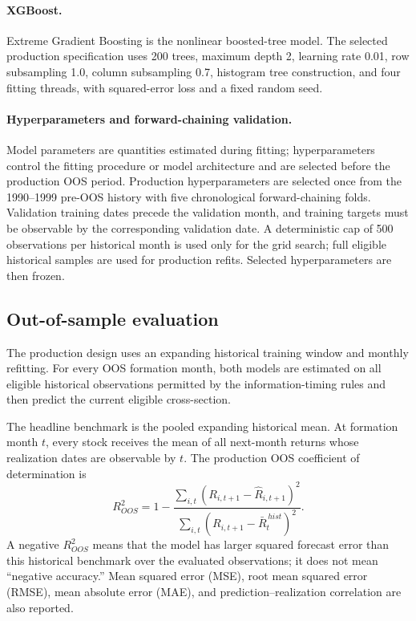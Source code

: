 \paragraph{XGBoost.}
Extreme Gradient Boosting is the nonlinear boosted-tree model. The selected production specification uses 200 trees, maximum depth 2, learning rate 0.01, row subsampling 1.0, column subsampling 0.7, histogram tree construction, and four fitting threads, with squared-error loss and a fixed random seed.

\paragraph{Hyperparameters and forward-chaining validation.}
Model parameters are quantities estimated during fitting; hyperparameters control the fitting procedure or model architecture and are selected before the production OOS period. Production hyperparameters are selected once from the 1990--1999 pre-OOS history with five chronological forward-chaining folds. Validation training dates precede the validation month, and training targets must be observable by the corresponding validation date. A deterministic cap of 500 observations per historical month is used only for the grid search; full eligible historical samples are used for production refits. Selected hyperparameters are then frozen.

\subsection{Out-of-sample evaluation}

The production design uses an expanding historical training window and monthly refitting. For every OOS formation month, both models are estimated on all eligible historical observations permitted by the information-timing rules and then predict the current eligible cross-section.

The headline benchmark is the pooled expanding historical mean. At formation month $t$, every stock receives the mean of all next-month returns whose realization dates are observable by $t$. The production OOS coefficient of determination is
\begin{equation}
R^2_{OOS}
=1-
\frac{\sum_{i,t}(R_{i,t+1}-\widehat R_{i,t+1})^2}
{\sum_{i,t}(R_{i,t+1}-\bar R^{\,hist}_{t})^2}.
\end{equation}
A negative $R^2_{OOS}$ means that the model has larger squared forecast error than this historical benchmark over the evaluated observations; it does not mean ``negative accuracy.'' Mean squared error (MSE), root mean squared error (RMSE), mean absolute error (MAE), and prediction--realization correlation are also reported.

